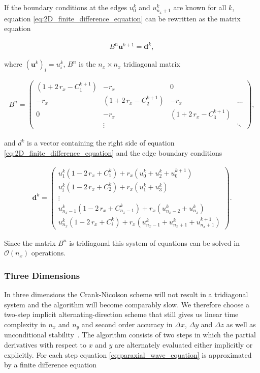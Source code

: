 If the boundary conditions at the edges $u_0^k$ and $u_{n_x+1}^k$ are known for all $k$, equation \eqref{eq:2D_finite_difference_equation} can be rewritten as the matrix equation

\begin{align} \label{eq:FD1DMatrixEquation}
B^n \boldsymbol u^{k+1} = \boldsymbol d^k,
\end{align}

where $\left(\boldsymbol u^{k}\right)_i = u_{i}^{k}$, $B^n$ is the $n_x \times n_x$ tridiagonal matrix

\begin{align*}
B^n = \left(
\begin{matrix}
    ( 1 + 2 \, r_x - C_1^{k+1} ) & - r_x & 0 &   \\
    - r_x  & ( 1 + 2 \, r_x - C_2^{k+1} ) & - r_x  & \dots \\
    0 & - r_x  & ( 1 + 2 \, r_x - C_3^{k+1} ) &  \\
     & \vdots & & \ddots
\end{matrix}
\right),
\end{align*}

and $d^k$ is a vector containing the right side of equation \eqref{eq:2D_finite_difference_equation} and the edge boundary conditions

\begin{align*}
\boldsymbol d^k = \left(
\begin{matrix}
u_{1}^{k } ( 1 - 2\,r_x + C_1^{k}) + r_x (u_{0}^{k } + u_{2}^{k } + u_{0}^{k+1} ) \\
u_i^{k } ( 1 - 2\,r_x + C_2^{k }) + r_x (u_{1}^{k } + u_{3}^{k }  ) \\
\vdots \\
u_{n_x - 1}^{k } ( 1 - 2\,r_x + C_{n_x - 1}^{k }) + r_x (u_{n_x - 2}^{k } + u_{n_x}^{k }  ) \\
u_{n_x}^{k } ( 1 - 2\,r_x + C_i^{k }) + r_x (u_{n_x-1}^{k } + u_{n_x+1}^{k } + u_{n_x+1}^{k+1} ) 
\end{matrix}
\right).
\end{align*}

Since the matrix $B^n$ is tridiagonal this system of equations can be solved in $\mathcal{O}(n_x)$ operations.

\subsubsection{Three Dimensions}

In three dimensions the Crank-Nicolson scheme will not result in a tridiagonal system and the algorithm will become comparably slow. We therefore choose a two-step implicit alternating-direction scheme that still gives us linear time complexity in $n_x$ and $n_y$ and second order accuracy in $\Delta x$, $\Delta y$ and $\Delta z$ as well as unconditional stability~\cite{DissertationFuhse}. The algorithm consists of two steps in which the partial derivatives with respect to $x$ and $y$ are alternately evaluated either implicitly or explicitly. For each step equation \eqref{eq:paraxial_wave_equation} is approximated by a finite difference equation

